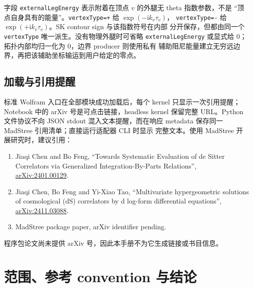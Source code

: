 \documentclass[11pt,a4paper]{ctexart}
\newcommand{\ii}{\mathrm i}
\begin{document}
字段 \texttt{externalLegEnergy} 表示附着在顶点 $v$ 的外腿无 theta 指数参数，不是
“顶点自身具有的能量”。\texttt{vertexType=+} 给 $\exp(-\ii k_v\tau_v)$，
\texttt{vertexType=-} 给 $\exp(+\ii k_v\tau_v)$。SK contour sign 与该指数符号在内部
分开保存，但都由同一个 \texttt{vertexType} 唯一派生。没有物理外腿时可省略
\texttt{externalLegEnergy} 或显式给 0；拓扑内部均归一化为 0，边界 producer 则使用私有
辅助阻尼能量建立无穷远边界，再把该辅助坐标输运到用户给定的零点。

\subsection{加载与引用提醒}

标准 Wolfram 入口在全部模块成功加载后，每个 kernel 只显示一次引用提醒；Notebook 中的
arXiv 号是可点击链接，headless kernel 保留完整 URL。Python 文件协议不向 JSON stdout
混入文本提醒，而在响应 metadata 保存同一 MadStree 引用清单；直接运行适配器 CLI 时显示
完整文本。使用 MadStree 开展研究时，建议引用：
\begin{enumerate}
  \item Jiaqi Chen and Bo Feng, ``Towards Systematic Evaluation of de Sitter Correlators via Generalized Integration-By-Parts Relations'', \href{https://arxiv.org/abs/2401.00129}{arXiv:2401.00129}.
  \item Jiaqi Chen, Bo Feng and Yi-Xiao Tao, ``Multivariate hypergeometric solutions of cosmological (dS) correlators by d log-form differential equations'', \href{https://arxiv.org/abs/2411.03088}{arXiv:2411.03088}.
  \item MadStree package paper, arXiv identifier pending.
\end{enumerate}
程序包论文尚未提供 arXiv 号，因此本手册不为它生成链接或书目信息。

\section{范围、参考 convention 与结论}
\end{document}
